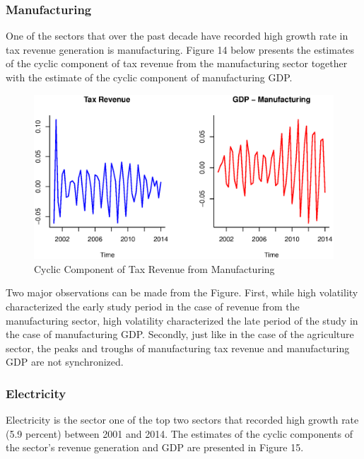 \documentclass[12pt,a4paper,final]{article}
\begin{document}

\subsubsection{Manufacturing}

One of the sectors that over the past decade have recorded high growth rate in tax revenue generation is manufacturing.  Figure 14 below presents the estimates of the cyclic component of tax revenue from the manufacturing sector together with the estimate of the cyclic component of manufacturing GDP.


\begin{figure}[h]
\centering
\begin{small}
\caption{Cyclic Component of Tax Revenue from Manufacturing}
\end{small}
\includegraphics[scale=0.601]{manufac.eps} 
\end{figure}

Two major observations can be made from the Figure. First, while high volatility characterized the early study period in the case of revenue from the manufacturing sector, high volatility characterized the late period of the study in the case of manufacturing GDP. Secondly, just like in the case of the agriculture sector, the peaks and troughs of manufacturing tax revenue and manufacturing GDP are not synchronized.

\subsubsection{Electricity}

Electricity is the sector one of the top two sectors that recorded high growth rate (5.9 percent) between 2001 and 2014. The estimates of the cyclic components of the sector's revenue generation and GDP are presented in Figure 15.
\end{document}
